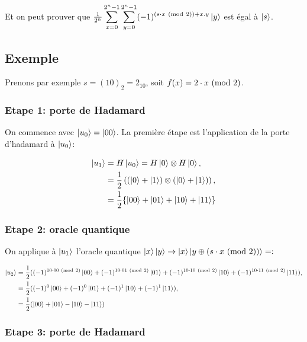 Et on peut prouver que $\frac{1}{2^{n}} \displaystyle\sum_{x=0}^{2^n-1} \displaystyle\sum_{y=0}^{2^n-1} (-1)^{(s \cdot x \ (\mathrm{mod}\ 2)) + x.y} \ket{y}$ est égal à $\ket{s}$.

\subsection{Exemple}

Prenons par exemple $s=(10)_2 = 2_{10}$, soit $f(x) = 2 \cdot x \ (\mathrm{mod}\ 2)$.
\subsubsection*{Etape 1: porte de Hadamard}

On commence avec $\ket{u_0} = \ket{00}$. La première étape est
l'application de la porte d'hadamard à $\ket{u_0}$:

\begin{align}
\ket{u_1} &= H\ket{u_0} = H\ket{0} \otimes H\ket{0} \nonumber ,\\
& = \frac{1}{2} \left( (\ket{0} + \ket{1})\otimes(\ket{0} + \ket{1}) \right) \nonumber ,\\
 & = \frac{1}{2}\{\ket{00} + \ket{01} + \ket{10} + \ket{11}\}
\end{align}


\subsubsection*{Etape 2: oracle quantique}

On applique à $\ket{u_1}$ l'oracle quantique $\ket{x}\ket{y}\rightarrow\ket{x}\ket{y\oplus (s \cdot x \ (\mathrm{mod}\ 2))} = :$

\begin{align}
  \ket{u_2} &= \frac{1}{2}((-1)^{10 \cdot 00 \ (\mathrm{mod}\ 2)} \ket{00} + (-1)^{10 \cdot 01 \ (\mathrm{mod}\ 2)} \ket{01} + (-1)^{10 \cdot 10 \ (\mathrm{mod}\ 2)} \ket{10} + (-1)^{10 \cdot 11 \ (\mathrm{mod}\ 2)} \ket{11}) \nonumber ,\\
  &= \frac{1}{2}((-1)^{0} \ket{00} + (-1)^{0} \ket{01} + (-1)^{1} \ket{10} + (-1)^{1} \ket{11}) \nonumber ,\\
  &= \frac{1}{2} (\ket{00} + \ket{01} - \ket{10} - \ket{11})
\end{align}

\subsubsection*{Etape 3: porte de Hadamard}

